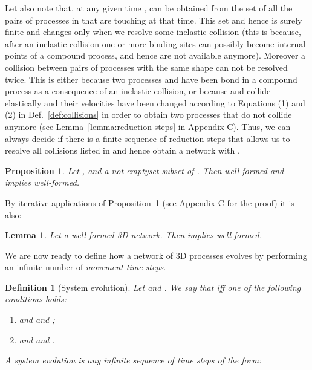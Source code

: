 \documentclass[11pt]{article}
\newtheorem{definition}{Definition}
\newtheorem{proposition}{Proposition}
\newtheorem{lemma}{Lemma}
\begin{document}
Let also note that, at any given time ,  can be obtained from the set of all the pairs of processes in  that are touching at that time. This set and hence  is surely finite and changes only when we resolve some inelastic collision (this is because, after an inelastic collision one or more binding sites can possibly become internal points of a compound process, and hence are not available anymore). Moreover a collision between pairs of processes with the same shape can not be resolved twice. This is either because two processes  and   have been bond in a compound process as a consequence of an inelastic collision, or because  and  collide elastically and their velocities have been changed according to Equations (1) and (2) in Def.~\ref{def:collisions} in order to obtain two processes that do not collide anymore (see Lemma~\ref{lemma:reduction-steps} in Appendix C). Thus, we can always decide if there is a finite sequence of reduction steps that allows us to resolve all collisions listed in   and hence obtain a network  with .


\begin{proposition}\label{prop:reduction-closure}
Let ,  and  a not-emptyset subset of . Then  well-formed
and  implies  well-formed.
\end{proposition}


By iterative applications of Proposition~\ref{prop:reduction-closure} (see Appendix C for the proof)
it is also:

\begin{lemma}\rm\label{lemma:reduction-closure}
Let  a well-formed 3D network. Then  implies  well-formed.
\end{lemma}


We are now ready to define how a network of 3D processes evolves by performing an infinite number of {\em movement time steps}.

\begin{definition}[System evolution]\label{def:mts}
Let   and . We say that  iff one of the following conditions holds:

\begin{enumerate}
\item  and  and ;

\item  and  and .
\end{enumerate}


A {\em system evolution} is any infinite sequence of time steps of the form:

\end{definition}
\end{document}
